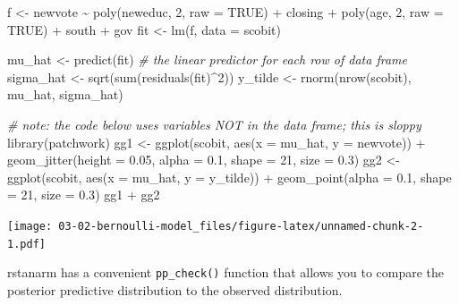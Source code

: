 \documentclass[
]{book}
\newenvironment{Shaded}{\begin{snugshade}}{\end{snugshade}}
\newcommand{\AttributeTok}[1]{\textcolor[rgb]{0.77,0.63,0.00}{#1}}
\newcommand{\CommentTok}[1]{\textcolor[rgb]{0.56,0.35,0.01}{\textit{#1}}}
\newcommand{\ConstantTok}[1]{\textcolor[rgb]{0.00,0.00,0.00}{#1}}
\newcommand{\DecValTok}[1]{\textcolor[rgb]{0.00,0.00,0.81}{#1}}
\newcommand{\FloatTok}[1]{\textcolor[rgb]{0.00,0.00,0.81}{#1}}
\newcommand{\FunctionTok}[1]{\textcolor[rgb]{0.00,0.00,0.00}{#1}}
\newcommand{\NormalTok}[1]{#1}
\newcommand{\OtherTok}[1]{\textcolor[rgb]{0.56,0.35,0.01}{#1}}
\newcommand{\SpecialCharTok}[1]{\textcolor[rgb]{0.00,0.00,0.00}{#1}}
\begin{document}
\begin{Shaded}
\begin{Highlighting}[]
\NormalTok{f }\OtherTok{\textless{}{-}}\NormalTok{ newvote }\SpecialCharTok{\textasciitilde{}} \FunctionTok{poly}\NormalTok{(neweduc, }\DecValTok{2}\NormalTok{, }\AttributeTok{raw =} \ConstantTok{TRUE}\NormalTok{) }\SpecialCharTok{+}\NormalTok{ closing }\SpecialCharTok{+} \FunctionTok{poly}\NormalTok{(age, }\DecValTok{2}\NormalTok{, }\AttributeTok{raw =} \ConstantTok{TRUE}\NormalTok{) }\SpecialCharTok{+}\NormalTok{ south }\SpecialCharTok{+}\NormalTok{ gov}
\NormalTok{fit }\OtherTok{\textless{}{-}} \FunctionTok{lm}\NormalTok{(f, }\AttributeTok{data =}\NormalTok{ scobit)}

\NormalTok{mu\_hat }\OtherTok{\textless{}{-}} \FunctionTok{predict}\NormalTok{(fit)  }\CommentTok{\# the linear predictor for each row of data frame}
\NormalTok{sigma\_hat }\OtherTok{\textless{}{-}} \FunctionTok{sqrt}\NormalTok{(}\FunctionTok{sum}\NormalTok{(}\FunctionTok{residuals}\NormalTok{(fit)}\SpecialCharTok{\^{}}\DecValTok{2}\NormalTok{))}
\NormalTok{y\_tilde }\OtherTok{\textless{}{-}} \FunctionTok{rnorm}\NormalTok{(}\FunctionTok{nrow}\NormalTok{(scobit), mu\_hat, sigma\_hat)}

\CommentTok{\# note: the code below uses variables NOT in the data frame; this is sloppy}
\FunctionTok{library}\NormalTok{(patchwork)}
\NormalTok{gg1 }\OtherTok{\textless{}{-}} \FunctionTok{ggplot}\NormalTok{(scobit, }\FunctionTok{aes}\NormalTok{(}\AttributeTok{x =}\NormalTok{ mu\_hat, }\AttributeTok{y =}\NormalTok{ newvote)) }\SpecialCharTok{+} 
  \FunctionTok{geom\_jitter}\NormalTok{(}\AttributeTok{height =} \FloatTok{0.05}\NormalTok{, }\AttributeTok{alpha =} \FloatTok{0.1}\NormalTok{, }\AttributeTok{shape =} \DecValTok{21}\NormalTok{, }\AttributeTok{size =} \FloatTok{0.3}\NormalTok{)}
\NormalTok{gg2 }\OtherTok{\textless{}{-}} \FunctionTok{ggplot}\NormalTok{(scobit, }\FunctionTok{aes}\NormalTok{(}\AttributeTok{x =}\NormalTok{ mu\_hat, }\AttributeTok{y =}\NormalTok{ y\_tilde)) }\SpecialCharTok{+} 
  \FunctionTok{geom\_point}\NormalTok{(}\AttributeTok{alpha =} \FloatTok{0.1}\NormalTok{, }\AttributeTok{shape =} \DecValTok{21}\NormalTok{, }\AttributeTok{size =} \FloatTok{0.3}\NormalTok{)}
\NormalTok{gg1 }\SpecialCharTok{+}\NormalTok{ gg2}
\end{Highlighting}
\end{Shaded}

\texttt{[image: 03-02-bernoulli-model\_files/figure-latex/unnamed-chunk-2-1.pdf]}

rstanarm has a convenient \texttt{pp\_check()} function that allows you
to compare the posterior predictive distribution to the observed
distribution.
\end{document}
